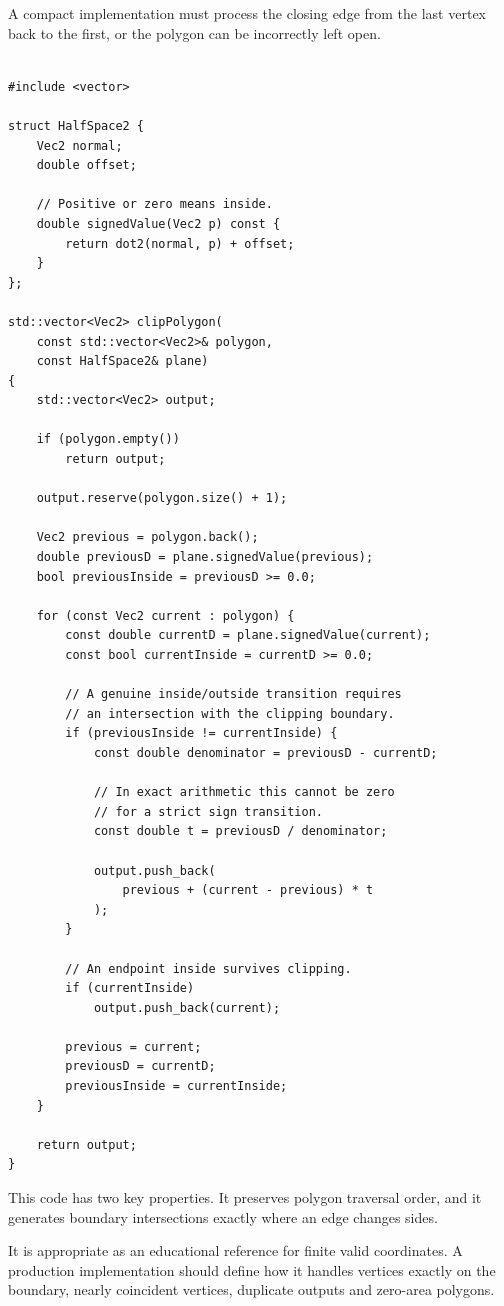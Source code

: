 A compact implementation must process the closing edge from the last vertex back to the first, or the polygon can be incorrectly left open.

\begin{verbatim}

#include <vector>

struct HalfSpace2 {
    Vec2 normal;
    double offset;

    // Positive or zero means inside.
    double signedValue(Vec2 p) const {
        return dot2(normal, p) + offset;
    }
};

std::vector<Vec2> clipPolygon(
    const std::vector<Vec2>& polygon,
    const HalfSpace2& plane)
{
    std::vector<Vec2> output;

    if (polygon.empty())
        return output;

    output.reserve(polygon.size() + 1);

    Vec2 previous = polygon.back();
    double previousD = plane.signedValue(previous);
    bool previousInside = previousD >= 0.0;

    for (const Vec2 current : polygon) {
        const double currentD = plane.signedValue(current);
        const bool currentInside = currentD >= 0.0;

        // A genuine inside/outside transition requires
        // an intersection with the clipping boundary.
        if (previousInside != currentInside) {
            const double denominator = previousD - currentD;

            // In exact arithmetic this cannot be zero
            // for a strict sign transition.
            const double t = previousD / denominator;

            output.push_back(
                previous + (current - previous) * t
            );
        }

        // An endpoint inside survives clipping.
        if (currentInside)
            output.push_back(current);

        previous = current;
        previousD = currentD;
        previousInside = currentInside;
    }

    return output;
}
\end{verbatim}

This code has two key properties. It preserves polygon traversal order, and it generates boundary intersections exactly where an edge changes sides.

It is appropriate as an educational reference for finite valid coordinates. A production implementation should define how it handles vertices exactly on the boundary, nearly coincident vertices, duplicate outputs and zero-area polygons.

